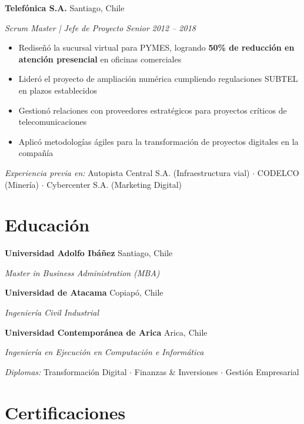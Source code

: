 \documentclass[11pt,letterpaper]{article}
\newcommand{\entry}[4]{%
  \noindent\textbf{#1} \hfill #2 \par\nopagebreak
  \textit{#3} \hfill \textit{#4} \par\nopagebreak
}
\begin{document}
\entry{Telef\'{o}nica S.A.}{Santiago, Chile}{Scrum Master | Jefe de Proyecto Senior}{2012 -- 2018}
\begin{itemize}
  \item Redise\~{n}\'{o} la sucursal virtual para PYMES, logrando \textbf{50\% de reducci\'{o}n en atenci\'{o}n presencial} en oficinas comerciales
  \item Lider\'{o} el proyecto de ampliaci\'{o}n num\'{e}rica cumpliendo regulaciones SUBTEL en plazos establecidos
  \item Gestion\'{o} relaciones con proveedores estrat\'{e}gicos para proyectos cr\'{i}ticos de telecomunicaciones
  \item Aplic\'{o} metodolog\'{i}as \'{a}giles para la transformaci\'{o}n de proyectos digitales en la compa\~{n}\'{i}a
\end{itemize}
\vspace{0.3em}

\noindent\textit{Experiencia previa en:} Autopista Central S.A. (Infraestructura vial) $\cdot$ CODELCO (Miner\'{i}a) $\cdot$ Cybercenter S.A. (Marketing Digital)

\section{Educaci\'{o}n}

\entry{Universidad Adolfo Ib\'{a}\~{n}ez}{Santiago, Chile}{Master in Business Administration (MBA)}{}
\vspace{0.3em}

\entry{Universidad de Atacama}{Copiap\'{o}, Chile}{Ingenier\'{i}a Civil Industrial}{}
\vspace{0.3em}

\entry{Universidad Contempor\'{a}nea de Arica}{Arica, Chile}{Ingenier\'{i}a en Ejecuci\'{o}n en Computaci\'{o}n e Inform\'{a}tica}{}
\vspace{0.3em}

\noindent\textit{Diplomas:} Transformaci\'{o}n Digital $\cdot$ Finanzas \& Inversiones $\cdot$ Gesti\'{o}n Empresarial

\section{Certificaciones}
\end{document}
